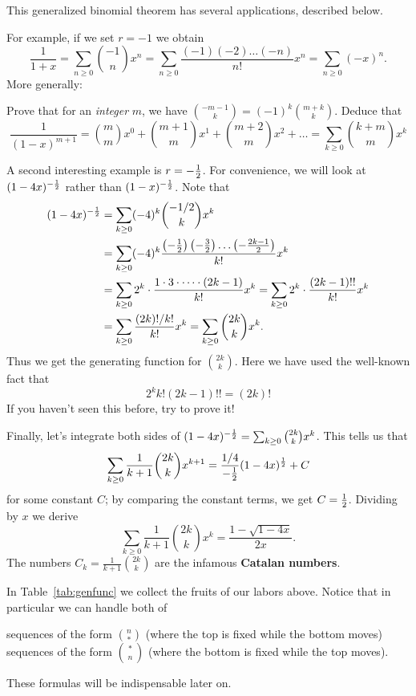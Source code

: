 \documentclass[11pt]{scrartcl}
\begin{document}
This generalized binomial theorem has several applications, described below.
\begin{itemize}
\ii For example, if we set $r = -1$ we obtain
\[
  \frac{1}{1+x}
  = \sum_{n \ge 0} \binom{-1}{n} x^n
  = \sum_{n \ge 0}
  \frac{(-1) (-2) \dots (-n)}{n!} x^n
  = \sum_{n \ge 0} (-x)^n.
\]
\ii More generally:
\begin{exercise}
  Prove that for an \emph{integer} $m$, we have
  $\binom{-m-1}{k} = (-1)^k \binom{m+k}{k}$.
  Deduce that
  \[
    \frac{1}{(1-x)^{m+1}}
    = \binom{m}{m} x^0 + \binom{m+1}{m} x^1 + \binom{m+2}{m} x^2 + \dots
    = \sum_{k \ge 0} \binom{k+m}{m} x^k
  \]
\end{exercise}
\ii A second interesting example is $r = -\frac{1}{2}$.
For convenience, we will look at $(1-4x)^{-\frac{1}{2}}$
rather than $(1-x)^{-\frac{1}{2}}$.
Note that
\begin{align*}
  (1-4x)^{-\frac{1}{2}}
  &= \sum_{k \ge 0} (-4)^k \binom{-1/2}{k} x^k \\
  &= \sum_{k \ge 0} (-4)^k \frac{\left( -\frac12 \right)\left( -\frac32 \right)\dots
    \left( -\frac{2k-1}{2} \right)}{k!} x^k \\
  &= \sum_{k \ge 0} 2^k \cdot \frac{1 \cdot 3 \cdot \dots \cdot (2k-1)}{k!} x^k
    = \sum_{k \ge 0} 2^k \cdot \frac{(2k-1)!!}{k!} x^k \\
  &= \sum_{k \ge 0} \frac{(2k)!/k!}{k!} x^k
    = \sum_{k \ge 0} \binom{2k}{k} x^k.
\end{align*}
Thus we get the generating function for $\binom{2k}{k}$.
Here we have used the well-known fact that
\[ 2^{k} k! (2k-1)!! = (2k)! \]
If you haven't seen this before, try to prove it!

\ii Finally, let's integrate both sides of
$(1-4x)^{-\frac{1}{2}} = \sum_{k \ge 0} \binom{2k}{k} x^k$.
This tells us that
\[ \sum_{k \ge 0} \frac{1}{k+1} \binom{2k}{k} x^{k+1}
  = \frac{1/4}{-\frac{1}{2}}(1-4x)^{\frac{1}{2}} + C \]
for some constant $C$; by comparing the constant terms, we get $C = \frac{1}{2}$.
Dividing by $x$ we derive
\[ \sum_{k \ge 0} \frac{1}{k+1} \binom{2k}{k} x^{k}
  = \frac{1 - \sqrt{1-4x}}{2x}. \]
The numbers $C_k = \frac{1}{k+1} \binom{2k}{k}$ are the
infamous \textbf{Catalan numbers}.
\end{itemize}

In Table~\ref{tab:genfunc} we collect the fruits of our labors above.
Notice that in particular we can handle both of
\begin{itemize}
  \ii sequences of the form $\binom{n}{\ast}$
  (where the top is fixed while the bottom moves)
  \ii sequences of the form $\binom{\ast}{n}$
  (where the bottom is fixed while the top moves).
\end{itemize}
These formulas will be indispensable later on.
\end{document}
